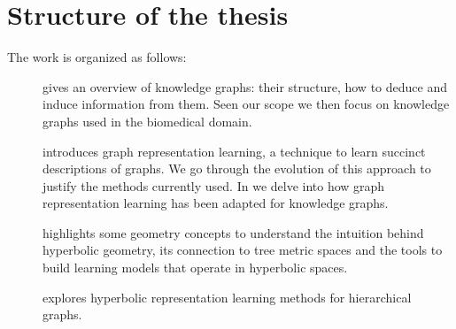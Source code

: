
\newpage
\section*{Structure of the thesis}
The work is organized as follows:
\begin{description}
    \item[] gives an overview of knowledge graphs: their structure, how to deduce and induce information from them. Seen our scope we then focus on knowledge graphs used in the biomedical domain.
    \item[] introduces graph representation learning, a technique to learn succinct descriptions of graphs. We go through the evolution of this approach to justify the methods currently used. In  we delve into how graph representation learning has been adapted for knowledge graphs.
    \item[] highlights some geometry concepts to understand the intuition behind hyperbolic geometry, its connection to tree metric spaces and the tools to build learning models that operate in hyperbolic spaces. 
    \item[] explores hyperbolic representation learning methods for hierarchical graphs. 
\end{description}